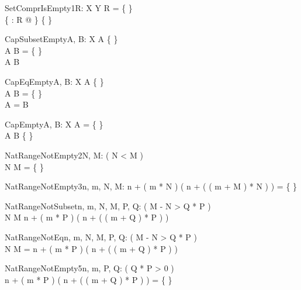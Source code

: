 
\begin{theorem}{SetComprIsEmpty1}{R: X \rel Y}
R = \{ \} \\
\{ \anything : \dom R @ \anything \} \neq \{ \}
\end{theorem}

\begin{theorem}{CapSubsetEmpty}{A, B: \power X}
A \neq \{ \} \\
A \cap B = \{ \} \\
A \subset B
\end{theorem}

\begin{theorem}{CapEqEmpty}{A, B: \power X}
A \neq \{ \} \\
A \cap B = \{ \} \\
A = B
\end{theorem}

\begin{theorem}{CapEmpty}{A, B: \power X}
A = \{ \} \\
A \cap B \neq \{ \}
\end{theorem}

\begin{theorem}{NatRangeNotEmpty2}{\const N, \const M: \nat}
\eval( N < M ) \\
N \upto M = \{ \}
\end{theorem}

\begin{theorem}{NatRangeNotEmpty3}{n, m, \const N, \const M: \nat}
n + ( m * N ) \upto ( n + ( ( m + M ) * N ) ) = \{ \}
\end{theorem}

\begin{theorem}{NatRangeNotSubset}{n, m, \const N, \const M, \const P, \const Q: \nat}
\eval( M - N > Q * P ) \\
N \upto M \subset n + ( m * P ) \upto ( n + ( ( m + Q ) * P ) )
\end{theorem}

\begin{theorem}{NatRangeNotEq}{n, m, \const N, \const M, \const P, \const Q: \nat}
\eval( M - N > Q * P ) \\
N \upto M = n + ( m * P ) \upto ( n + ( ( m + Q ) * P ) )
\end{theorem}

\begin{theorem}{NatRangeNotEmpty5}{n, m, \const P, \const Q: \nat}
\eval( Q * P > 0 ) \\
n + ( m * P ) \upto ( n + ( ( m + Q ) * P ) ) = \{ \}
\end{theorem}

